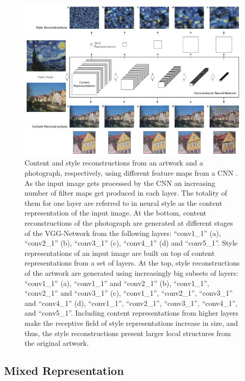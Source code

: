 \begin{figure}[htb]
  \includegraphics[width=\textwidth]{gfx/neural-style-cnn}
  \caption{
    Content and style reconstructions from an artwork and a photograph, respectively, using different feature maps from a CNN \cite{Gatys2015B}.
    As the input image gets processed by the CNN an increasing number of filter maps get produced in each layer.
    The totality of them for one layer are referred to in neural style as the content representation of the input image.
    At the bottom, content reconstructions of the photograph are generated at different stages of the VGG-Network from the following layers: ``conv1\_1'' (a), ``conv2\_1'' (b), ``conv3\_1'' (c), ``conv4\_1'' (d) and ``conv5\_1''.
    Style representations of an input image are built on top of content representations from a set of layers.
    At the top, style reconstructions of the artwork are generated using increasingly big subsets of layers: ``conv1\_1'' (a), ``conv1\_1'' and ``conv2\_1'' (b), ``conv1\_1'', ``conv2\_1'' and ``conv3\_1'' (c), ``conv1\_1'', ``conv2\_1'', ``conv3\_1'' and ``conv4\_1'' (d), ``conv1\_1'', ``conv2\_1'', ``conv3\_1'', ``conv4\_1'', and ``conv5\_1''.
    Including content representations from higher layers make the receptive field of style representations increase in size, and thus, the style reconstructions present larger local structures from the original artwork.
  }
  \label{sub:system:method:reconstructions}
\end{figure}


\subsection{Mixed Representation}
\label{sub:system:method:mixed-representation}

